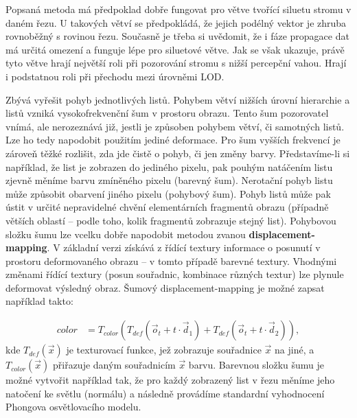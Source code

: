 Popsaná metoda má předpoklad dobře fungovat pro větve tvořící siluetu stromu v daném řezu. U takových větví se předpokládá, že jejich podélný vektor je zhruba rovnoběžný s rovinou řezu. Současně je třeba si uvědomit, že i fáze propagace dat má určitá omezení a funguje lépe pro siluetové větve. Jak se však ukazuje, právě tyto větve hrají největší roli při pozorování stromu s nižší percepční vahou. Hrají i podstatnou roli při přechodu mezi úrovněmi LOD.

Zbývá vyřešit pohyb jednotlivých listů. Pohybem větví nižších úrovní hierarchie a listů vzniká vysokofrekvenční šum v prostoru obrazu. Tento šum pozorovatel vnímá, ale nerozeznává již, jestli je způsoben pohybem větví, či samotných listů. Lze ho tedy napodobit použitím jediné deformace. Pro šum vyšších frekvencí je zároveň těžké rozlišit, zda jde čistě o pohyb, či jen změny barvy. Představíme-li si například, že list je zobrazen do jediného pixelu, pak pouhým natáčením listu zjevně měníme barvu zmíněného pixelu (barevný šum). Nerotační pohyb listu může způsobit obarvení jiného pixelu (pohybový šum). Pohyb listů může pak ústit v určité nepravidelné chvění elementárních fragmentů obrazu (případně větších oblastí – podle toho, kolik fragmentů zobrazuje stejný list).
Pohybovou složku šumu lze vcelku dobře napodobit metodou zvanou {\bf displacement-mapping}. V základní verzi získává z řídící textury informace o posunutí v prostoru deformovaného obrazu – v tomto případě barevné textury. Vhodnými změnami řídící textury (posun souřadnic, kombinace různých textur) lze plynule deformovat výsledný obraz. Šumový displacement-mapping je možné zapsat například takto:

\begin{align} 
color &= T_{color}(T_{def}(\vec{o}_t + t \cdot \vec{d}_1)+T_{def}(\vec{o}_t + t \cdot \vec{d}_2)),
\end{align}
kde $T_{def}(\vec{x})$ je texturovací funkce, jež zobrazuje souřadnice $\vec{x}$ na jiné, a $T_{color}(\vec{x})$ přiřazuje daným souřadnicím $\vec{x}$ barvu. 
Barevnou složku šumu je možné vytvořit například tak, že pro každý zobrazený list v řezu měníme jeho natočení ke světlu (normálu) a následně provádíme standardní vyhodnocení Phongova osvětlovacího modelu.

\pagebreak

